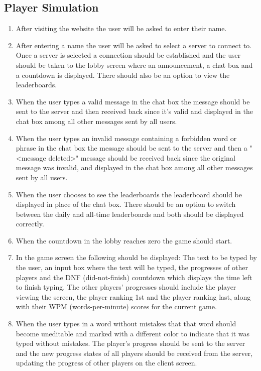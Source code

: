 \documentclass[titlepage]{article}
\begin{document}
\subsection{Player Simulation}
\begin{enumerate}
	\item After visiting the website the user will be asked to enter their name.
	\item After entering a name the user will be asked to select a server to connect to. Once a server is selected a connection should be established and the user should be taken to the lobby screen where an announcement, a chat box and a countdown is displayed. There should also be an option to view the leaderboards.
	\item When the user types a valid message in the chat box the message should be sent to the server and then received back since it's valid and displayed in the chat box among all other messages sent by all users.
	\item When the user types an invalid message containing a forbidden word or phrase in the chat box the message should be sent to the server and then a "<message deleted>" message should be received back since the original message was invalid, and displayed in the chat box among all other messages sent by all users.
	\item When the user chooses to see the leaderboards the leaderboard should be displayed in place of the chat box. There should be an option to switch between the daily and all-time leaderboards and both should be displayed correctly.
	\item When the countdown in the lobby reaches zero the game should start.
	\item In the game screen the following should be displayed: The text to be typed by the user, an input box where the text will be typed, the progresses of other players and the DNF (did-not-finish) countdown which displays the time left to finish typing. The other players' progresses should include the player viewing the screen, the player ranking 1st and the player ranking last, along with their WPM (words-per-minute) scores for the current game.
	\item When the user types in a word without mistakes that that word should become uneditable and marked with a different color to indicate that it was typed without mistakes. The player's progress should be sent to the server and the new progress states of all players should be received from the server, updating the progress of other players on the client screen.

\end{enumerate}
\end{document}
